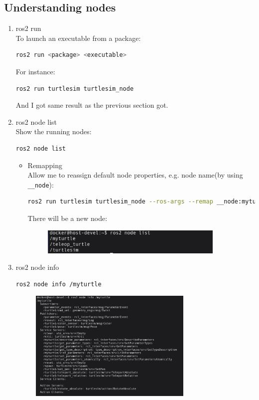 \documentclass[12pt, a4paper]{article}
\begin{document}
\subsection{Understanding nodes}
\begin{enumerate}
	\item ros2 run\\
		To launch an executable from a package:
\begin{lstlisting}[language=bash]
ros2 run <package> <executable>
\end{lstlisting}
For instance:
\begin{lstlisting}[language=bash]
ros2 run turtlesim turtlesim_node
\end{lstlisting}
And I got same result as the previous section got.
	\item ros2 node list\\
Show the running nodes:
\begin{lstlisting}[language=bash]
ros2 node list
\end{lstlisting}
\begin{itemize}
	\item Remapping\\
		Allow me to reassign default node properties, e.g. node name(by using \texttt{\_\_node}):
\begin{lstlisting}[language=bash]
ros2 run turtlesim turtlesim_node --ros-args --remap __node:myturtle
\end{lstlisting}
There will be a new node:
\begin{figure}[h]
	\setlength{\leftskip}{4.4em}
	\includegraphics[width=0.88\textwidth]{p1.3-1}
\end{figure}
\end{itemize}
	\item ros2 node info
\begin{lstlisting}[language=bash]
ros2 node info /myturtle
\end{lstlisting}
\begin{figure}[h]
	\centering
	\includegraphics[width=0.74\textwidth]{p1.3-2}
\end{figure}
\end{enumerate}
\end{document}
